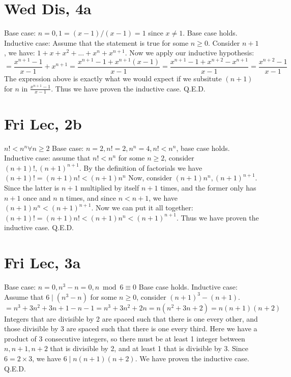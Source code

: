 \documentclass[12pt]{article}
\begin{document}
\section{Wed Dis, 4a}
Base case: $n = 0, 1 = (x-1)/(x-1) = 1$ since $x \neq 1$. Base case holds.
\newline
Inductive case: Assume that the statement is true for some $n \geq 0$. Consider $n+1$, we have: $1 + x + x^2 + ... + x^n + x^{n+1}$. Now we apply our inductive hypothesis:
$$= \frac{x^{n+1}-1}{x-1} + x^{n+1} = \frac{x^{n+1}-1+x^{n+1}(x-1)}{x-1} = \frac{x^{n+1}-1+x^{n+2}-x^{n+1}}{x-1} = \frac{x^{n+2}-1}{x-1}$$
The expression above is exactly what we would expect if we subsitute $(n+1)$ for $n$ in $\frac{x^{n+1}-1}{x-1}$. Thus we have proven the inductive case. Q.E.D.
\newpage


\section{Fri Lec, 2b}
$n! < n^n \forall n \geq 2$
\newline
Base case: $n=2, n!=2, n^n=4, n! < n^n$, base case holds.
\newline
Inductive case: assume that $n! < n^n$ for some $n \geq 2$, consider $(n+1)!, (n+1)^{n+1}$. By the definition of factorials we have $(n+1)! = (n+1)n! < (n+1)n^n$
\newline
Now, consider $(n+1)n^n, (n+1)^{n+1}$. Since the latter is $n+1$ multiplied by itself $n+1$ times, and the former only has $n+1$ once and $n$ n times, and since $n<n+1$, we have $(n+1)n^n < (n+1)^{n+1}$.
\newline
Now we can put it all together: $(n+1)! = (n+1)n! < (n+1)n^n < (n+1)^{n+1}$. Thus we have proven the inductive case. Q.E.D.

\section{Fri Lec, 3a}
Base case: $n = 0, n^3-n = 0, n \bmod 6 \equiv 0$ Base case holds.
\newline
Inductive case: Assume that $6 \mid (n^3-n)$ for some $n \geq 0$, consider $(n+1)^3-(n+1)$.
$$= n^3 + 3n^2 + 3n + 1 - n -1 = n^3+3n^2+2n = n(n^2+3n+2) = n(n+1)(n+2)$$
Integers that are divisible by 2 are spaced such that there is one every other, and those divisible by 3 are spaced such that there is one every third. Here we have a product of 3 consecutive integers, so there must be at least 1 integer between $n, n+1, n+2$ that is divisible by 2, and at least 1 that is divisible by 3. Since $6=2 \times 3$, we have $6 \mid n(n+1)(n+2)$.
\newline
We have proven the inductive case. Q.E.D.
\end{document}
